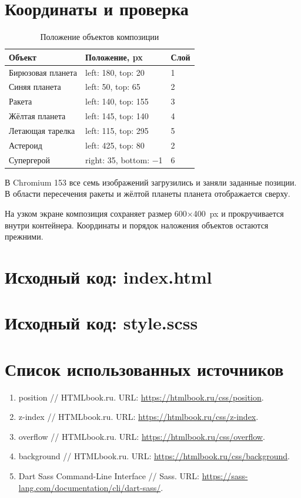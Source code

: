 \documentclass[14pt,a4paper]{extarticle}
\newcommand{\listing}[1]{\begingroup\singlespacing\setlength{\topsep}{0pt}\setlength{\partopsep}{0pt}\endgroup}
\begin{document}
\clearpage
\section{Координаты и проверка}
\begin{table}[H]
\caption{Положение объектов композиции}
\begingroup\fontsize{12}{14}\selectfont\singlespacing
\renewcommand{\arraystretch}{1.25}
\begin{tabularx}{\textwidth}{|Y|Y|Y|}
\hline
Объект & Положение, px & Слой\\ \hline
Бирюзовая планета & left: 180, top: 20 & 1\\ \hline
Синяя планета & left: 50, top: 65 & 2\\ \hline
Ракета & left: 140, top: 155 & 3\\ \hline
Жёлтая планета & left: 145, top: 140 & 4\\ \hline
Летающая тарелка & left: 115, top: 295 & 5\\ \hline
Астероид & left: 425, top: 80 & 2\\ \hline
Супергерой & right: 35, bottom: −1 & 6\\ \hline
\end{tabularx}
\endgroup
\end{table}

В Chromium 153 все семь изображений загрузились и заняли заданные позиции. В области пересечения ракеты и жёлтой планеты планета отображается сверху.

На узком экране композиция сохраняет размер 600×400~px и прокручивается внутри контейнера. Координаты и порядок наложения объектов остаются прежними.


\clearpage
\section{Исходный код: index.html}
\listing{index.html}

\clearpage
\section{Исходный код: style.scss}
\listing{style.scss}
\clearpage
\section*{Список использованных источников}
\begin{enumerate}[label=\arabic*.,leftmargin=8mm,itemsep=8pt,parsep=0pt]
\item position // HTMLbook.ru. URL: \url{https://htmlbook.ru/css/position}.
\item z-index // HTMLbook.ru. URL: \url{https://htmlbook.ru/css/z-index}.
\item overflow // HTMLbook.ru. URL: \url{https://htmlbook.ru/css/overflow}.
\item background // HTMLbook.ru. URL: \url{https://htmlbook.ru/css/background}.
\item Dart Sass Command-Line Interface // Sass. URL: \url{https://sass-lang.com/documentation/cli/dart-sass/}.
\end{enumerate}
\end{document}
